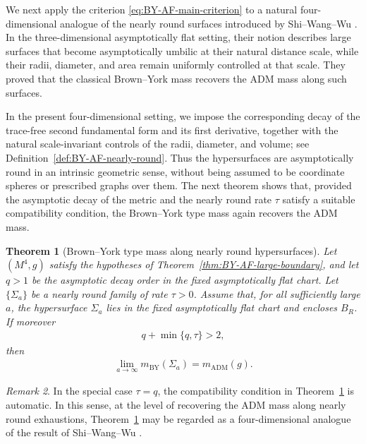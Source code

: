 \documentclass[10pt]{amsart}
\newcommand{\ADM}{\mathrm{ADM}}
\newcommand{\BY}{\mathrm{BY}}
\theoremstyle{plain}
\newtheorem{theorem}{Theorem}[section]
\theoremstyle{remark}
\newtheorem{remark}[theorem]{Remark}
\begin{document}
	We next apply the criterion
	\eqref{eq:BY-AF-main-criterion} to a natural four-dimensional analogue
	of the nearly round surfaces introduced by Shi--Wang--Wu
	\cite{ShiWangWu}.  In the three-dimensional asymptotically flat setting,
	their notion describes large surfaces that become asymptotically umbilic
	at their natural distance scale, while their radii, diameter, and area
	remain uniformly controlled at that scale.  They proved that the
	classical Brown--York mass recovers the ADM mass along such surfaces.
	
	In the present four-dimensional setting, we impose the corresponding
	decay of the trace-free second fundamental form and its first derivative,
	together with the natural scale-invariant controls of the radii,
	diameter, and volume; see
	Definition~\ref{def:BY-AF-nearly-round}.  Thus the hypersurfaces are
	asymptotically round in an intrinsic geometric sense, without being
	assumed to be coordinate spheres or prescribed graphs over them.  The
	next theorem shows that, provided the asymptotic decay of the metric and
	the nearly round rate $\tau$ satisfy a suitable compatibility condition,
	the Brown--York type mass again recovers the ADM mass.
	
	\begin{theorem}[Brown--York type mass along nearly round hypersurfaces]
		\label{thm:BY-AF-nearly-round}
		Let $(M^4,g)$ satisfy the hypotheses of
		Theorem~\ref{thm:BY-AF-large-boundary}, and let $q>1$ be the
		asymptotic decay order in the fixed asymptotically flat chart.
		Let $\{\Sigma_a\}$ be a nearly round family of rate $\tau>0$.
		Assume that, for all sufficiently large $a$, the hypersurface
		$\Sigma_a$ lies in the fixed asymptotically flat chart and encloses
		$B_R$. If moreover
		\begin{align*}
			q+\min\{q,\tau\}>2,
		\end{align*}
		then
		\begin{align}
			\lim_{a\to\infty}m_{\BY}(\Sigma_a)
			=
			m_{\ADM}(g).
		\end{align}
	\end{theorem}
	
	\begin{remark}
		In the special case $\tau=q$, the compatibility condition in
		Theorem~\ref{thm:BY-AF-nearly-round} is automatic. In this sense, at the level of recovering
		the ADM mass along nearly round exhaustions,
		Theorem~\ref{thm:BY-AF-nearly-round} may be regarded as a
		four-dimensional analogue of the result of Shi--Wang--Wu
		\cite{ShiWangWu}.
	\end{remark}
	
\end{document}
